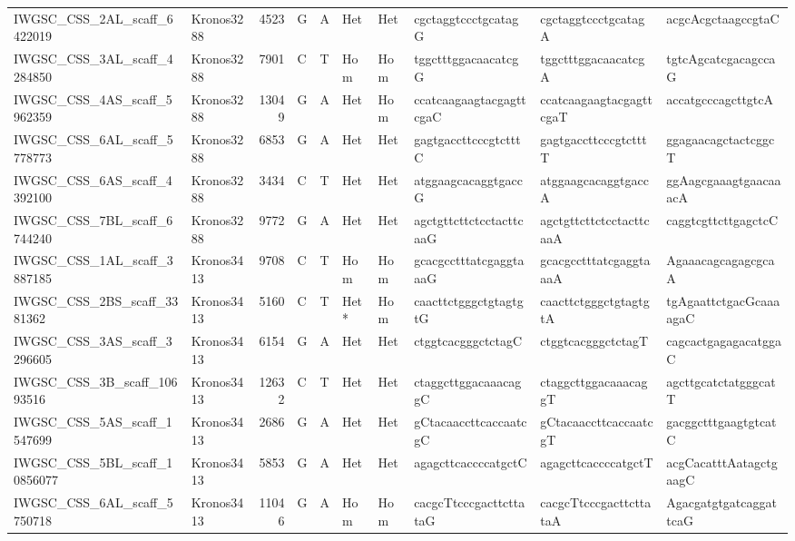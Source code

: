 \begin{longtable}{llrlllllll}
 IWGSC\_CSS\_2AL\_scaff\_6422019  & Kronos3288 &  4523 & G    & A     & Het    & Het   & cgctaggtccctgcatagG      & cgctaggtccctgcatagA      & acgcAcgctaagccgtaC       \\
 IWGSC\_CSS\_3AL\_scaff\_4284850  & Kronos3288 &  7901 & C    & T     & Hom    & Hom   & tggctttggacaacatcgG      & tggctttggacaacatcgA      & tgtcAgcatcgacagccaG      \\
 IWGSC\_CSS\_4AS\_scaff\_5962359  & Kronos3288 & 13049 & G    & A     & Het    & Hom   & ccatcaagaagtacgagttcgaC  & ccatcaagaagtacgagttcgaT  & accatgcccagcttgtcA       \\
 IWGSC\_CSS\_6AL\_scaff\_5778773  & Kronos3288 &  6853 & G    & A     & Het    & Het   & gagtgaccttcccgtctttC     & gagtgaccttcccgtctttT     & ggagaacagctactcggcT      \\
 IWGSC\_CSS\_6AS\_scaff\_4392100  & Kronos3288 &  3434 & C    & T     & Het    & Het   & atggaagcacaggtgaccG      & atggaagcacaggtgaccA      & ggAagcgaaagtgaacaaacA    \\
 IWGSC\_CSS\_7BL\_scaff\_6744240  & Kronos3288 &  9772 & G    & A     & Het    & Het   & agctgttcttctcctacttcaaG  & agctgttcttctcctacttcaaA  & caggtcgttcttgagctcC      \\
 IWGSC\_CSS\_1AL\_scaff\_3887185  & Kronos3413 &  9708 & C    & T     & Hom    & Hom   & gcacgcctttatcgaggtaaaG   & gcacgcctttatcgaggtaaaA   & AgaaacagcagagcgcaA       \\
 IWGSC\_CSS\_2BS\_scaff\_3381362  & Kronos3413 &  5160 & C    & T     & Het*   & Hom   & caacttctgggctgtagtgtG    & caacttctgggctgtagtgtA    & tgAgaattctgacGcaaaagaC   \\
 IWGSC\_CSS\_3AS\_scaff\_3296605  & Kronos3413 &  6154 & G    & A     & Het    & Het   & ctggtcacgggctctagC       & ctggtcacgggctctagT       & cagcactgagagacatggaC     \\
 IWGSC\_CSS\_3B\_scaff\_10693516  & Kronos3413 & 12632 & C    & T     & Het    & Het   & ctaggcttggacaaacaggC     & ctaggcttggacaaacaggT     & agcttgcatctatgggcatT     \\
 IWGSC\_CSS\_5AS\_scaff\_1547699  & Kronos3413 &  2686 & G    & A     & Het    & Het   & gCtacaaccttcaccaatcgC    & gCtacaaccttcaccaatcgT    & gacggctttgaagtgtcatC     \\
 IWGSC\_CSS\_5BL\_scaff\_10856077 & Kronos3413 &  5853 & G    & A     & Het    & Het   & agagcttcaccccatgctC      & agagcttcaccccatgctT      & acgCacatttAatagctgaagC   \\
 IWGSC\_CSS\_6AL\_scaff\_5750718  & Kronos3413 & 11046 & G    & A     & Hom    & Hom   & cacgcTtcccgacttcttataG   & cacgcTtcccgacttcttataA   & AgacgatgtgatcaggattcaG   \\

\end{longtable}
